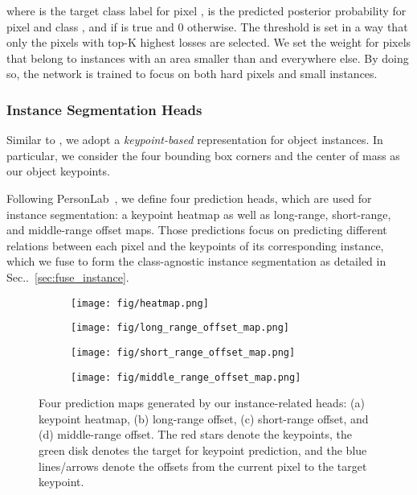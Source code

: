 \documentclass[10pt,twocolumn,letterpaper]{article}
\makeatletter
\def\@onedot{\ifx\@let@token.\else.\null\fi\xspace}
\DeclareRobustCommand\onedot{\futurelet\@let@token\@onedot}
\newcommand{\secref}[1]{Sec\onedot~\ref{#1}}
\makeatother
\begin{document}
 
where  is the target class label for pixel ,  is the predicted posterior probability for pixel  and class , and  if  is true and 0 otherwise. The threshold  is set in a way that only the pixels with top-K highest losses are selected. We set the weight  for pixels that belong to instances with an area smaller than  and  everywhere else. By doing so, the network is trained to focus on both hard pixels and small instances.

\subsubsection{Instance Segmentation Heads}
\label{subsubsec:instance_segmentation_prediction}

Similar to \cite{papandreou2018personlab, tychsen2017denet, law2018cornernet}, we adopt a \emph{keypoint-based} representation for object instances. In particular, we consider the four bounding box corners and the center of mass as our  object keypoints.

Following PersonLab~\cite{papandreou2018personlab}, we define four prediction heads, which are used for instance segmentation: a keypoint heatmap as well as long-range, short-range, and middle-range offset maps. Those predictions focus on predicting different relations between each pixel and the keypoints of its corresponding instance, which we fuse to form the class-agnostic instance segmentation as detailed in \secref{sec:fuse_instance}.

\begin{figure}
     \centering
     \begin{subfigure}[b]{0.1\textwidth}
         \centering
         \texttt{[image: fig/heatmap.png]}
         \caption{}
         \label{fig:heatmap}
     \end{subfigure}
     \hfill
     \begin{subfigure}[b]{0.1\textwidth}
         \centering
         \texttt{[image: fig/long\_range\_offset\_map.png]}
         \caption{}
         \label{fig:long_range_offset_map}
     \end{subfigure}
     \hfill
     \begin{subfigure}[b]{0.1\textwidth}
         \centering
         \texttt{[image: fig/short\_range\_offset\_map.png]}
         \caption{}
         \label{fig:short_range_offset_map}
     \end{subfigure}
     \hfill
     \begin{subfigure}[b]{0.1\textwidth}
         \centering
         \texttt{[image: fig/middle\_range\_offset\_map.png]}
         \caption{}
         \label{fig:middle_range_offset_map}
     \end{subfigure}
        \caption{Four prediction maps generated by our instance-related heads: (a) keypoint heatmap, (b) long-range offset, (c) short-range offset, and (d) middle-range offset. The red stars denote the keypoints, the green disk denotes the target for keypoint prediction, and the blue lines/arrows denote the offsets from the current pixel to the target keypoint.}
        \label{fig:instance_predictions}
\end{figure}
\end{document}
